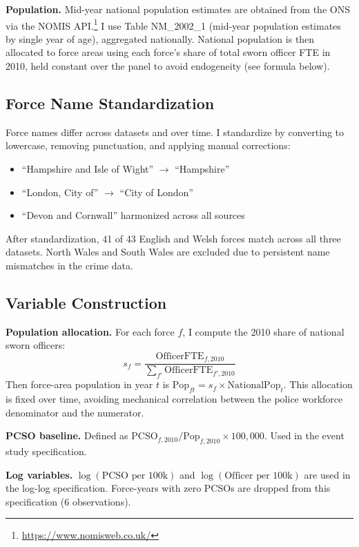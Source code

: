 \documentclass[12pt]{article}
\begin{document}
\textbf{Population.} Mid-year national population estimates are obtained from the ONS via the NOMIS API.\footnote{\url{https://www.nomisweb.co.uk/}} I use Table NM\_2002\_1 (mid-year population estimates by single year of age), aggregated nationally. National population is then allocated to force areas using each force's share of total sworn officer FTE in 2010, held constant over the panel to avoid endogeneity (see formula below).

\subsection{Force Name Standardization}

Force names differ across datasets and over time. I standardize by converting to lowercase, removing punctuation, and applying manual corrections:
\begin{itemize}
    \item ``Hampshire and Isle of Wight'' $\rightarrow$ ``Hampshire''
    \item ``London, City of'' $\rightarrow$ ``City of London''
    \item ``Devon and Cornwall'' harmonized across all sources
\end{itemize}

After standardization, 41 of 43 English and Welsh forces match across all three datasets. North Wales and South Wales are excluded due to persistent name mismatches in the crime data.

\subsection{Variable Construction}\label{sec:variables}

\textbf{Population allocation.} For each force $f$, I compute the 2010 share of national sworn officers:
\[
s_f = \frac{\text{OfficerFTE}_{f,2010}}{\sum_{f'} \text{OfficerFTE}_{f',2010}}
\]
Then force-area population in year $t$ is $\text{Pop}_{ft} = s_f \times \text{NationalPop}_t$. This allocation is fixed over time, avoiding mechanical correlation between the police workforce denominator and the numerator.

\textbf{PCSO baseline.} Defined as $\text{PCSO}_{f,2010} / \text{Pop}_{f,2010} \times 100{,}000$. Used in the event study specification.

\textbf{Log variables.} $\log(\text{PCSO per 100k})$ and $\log(\text{Officer per 100k})$ are used in the log-log specification. Force-years with zero PCSOs are dropped from this specification (6 observations).
\end{document}
